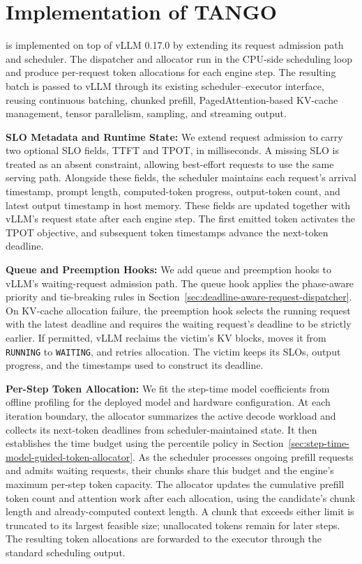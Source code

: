 \section{Implementation of TANGO}
\label{sec:implementation-of-tango}

\tango{} is implemented on top of vLLM 0.17.0 by extending its request admission path and scheduler.
The dispatcher and allocator run in the CPU-side scheduling loop and produce per-request token allocations for each engine step.
The resulting batch is passed to vLLM through its existing scheduler--executor interface, reusing continuous batching, chunked prefill, PagedAttention-based KV-cache management, tensor parallelism, sampling, and streaming output.

\textbf{SLO Metadata and Runtime State:}
We extend request admission to carry two optional SLO fields, TTFT and TPOT, in milliseconds.
A missing SLO is treated as an absent constraint, allowing best-effort requests to use the same serving path.
Alongside these fields, the scheduler maintains each request's arrival timestamp, prompt length, computed-token progress, output-token count, and latest output timestamp in host memory.
These fields are updated together with vLLM's request state after each engine step.
The first emitted token activates the TPOT objective, and subsequent token timestamps advance the next-token deadline.

\textbf{Queue and Preemption Hooks:}
We add queue and preemption hooks to vLLM's waiting-request admission path.
The queue hook applies the phase-aware priority and tie-breaking rules in Section~\ref{sec:deadline-aware-request-dispatcher}.
On KV-cache allocation failure, the preemption hook selects the running request with the latest deadline and requires the waiting request's deadline to be strictly earlier.
If permitted, vLLM reclaims the victim's KV blocks, moves it from \texttt{RUNNING} to \texttt{WAITING}, and retries allocation.
The victim keeps its SLOs, output progress, and the timestamps used to construct its deadline.

\textbf{Per-Step Token Allocation:}
We fit the step-time model coefficients from offline profiling for the deployed model and hardware configuration.
At each iteration boundary, the allocator summarizes the active decode workload and collects its next-token deadlines from scheduler-maintained state.
It then establishes the time budget using the percentile policy in Section~\ref{sec:step-time-model-guided-token-allocator}.
As the scheduler processes ongoing prefill requests and admits waiting requests, their chunks share this budget and the engine's maximum per-step token capacity.
The allocator updates the cumulative prefill token count and attention work after each allocation, using the candidate's chunk length and already-computed context length.
A chunk that exceeds either limit is truncated to its largest feasible size; unallocated tokens remain for later steps.
The resulting token allocations are forwarded to the executor through the standard scheduling output.

